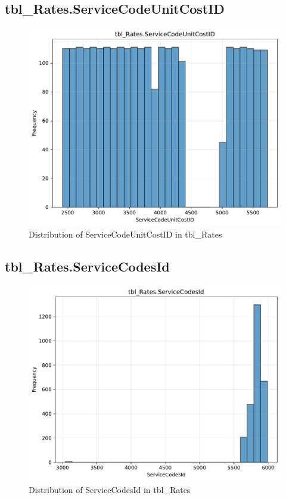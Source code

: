\subsection{tbl\_Rates.ServiceCodeUnitCostID}

\begin{figure}[htbp]
\centering
\includegraphics[width=\textwidth]{figures/dbo_tbl_Rates_ServiceCodeUnitCostID.pdf}
\caption{Distribution of ServiceCodeUnitCostID in tbl\_Rates}
\end{figure}\newpage

\subsection{tbl\_Rates.ServiceCodesId}

\begin{figure}[htbp]
\centering
\includegraphics[width=\textwidth]{figures/dbo_tbl_Rates_ServiceCodesId.pdf}
\caption{Distribution of ServiceCodesId in tbl\_Rates}
\end{figure}\newpage

